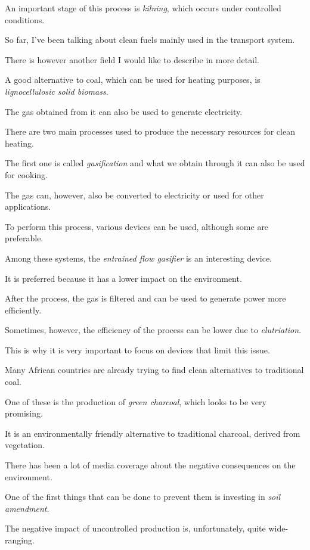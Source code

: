 An important stage of this process is \textit{kilning}, which occurs under controlled conditions.

So far, I've been talking about clean fuels mainly used in the transport system.

\ex There is however another field I would like to describe in more detail.

A good alternative to coal, which can be used for heating purposes, is \textit{lignocellulosic solid biomass}.

The gas obtained from it can also be used to generate electricity.

\ex There are two main processes used to produce the necessary resources for clean heating.

The first one is called \textit{gasification} and what we obtain through it can also be used for cooking.

The gas can, however, also be converted to electricity or used for other applications.

\ex To perform this process, various devices can be used, although some are preferable.

Among these systems, the \textit{entrained flow gasifier} is an interesting device.

It is preferred because it has a lower impact on the environment.

\ex After the process, the gas is filtered and can be used to generate power more efficiently.

Sometimes, however, the efficiency of the process can be lower due to \textit{elutriation}.

This is why it is very important to focus on devices that limit this issue.

\ex Many African countries are already trying to find clean alternatives to traditional coal.

One of these is the production of \textit{green charcoal}, which looks to be very promising.

It is an environmentally friendly alternative to traditional charcoal, derived from vegetation.

\ex There has been a lot of media coverage about the negative consequences on the environment.

One of the first things that can be done to prevent them is investing in \textit{soil amendment}.

The negative impact of uncontrolled production is, unfortunately, quite wide-ranging.

